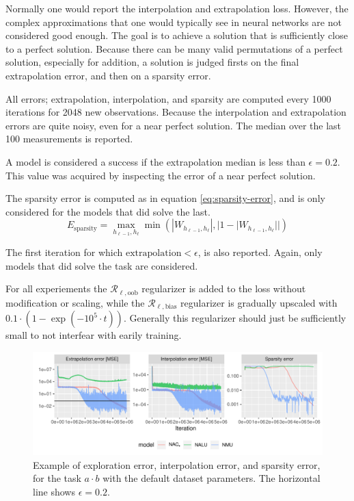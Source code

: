 Normally one would report the interpolation and extrapolation loss. However, the complex approximations that one would typically see in neural networks are not considered good enough. The goal is to achieve a solution that is sufficiently close to a perfect solution. Because there can be many valid permutations of a perfect solution, especially for addition, a solution is judged firsts on the final extrapolation error, and then on a sparsity error.

All errors; extrapolation, interpolation, and sparsity are computed every 1000 iterations for 2048 new observations. Because the interpolation and extrapolation errors are quite noisy, even for a near perfect solution. The median over the last 100 measurements is reported.

A model is considered a success if the extrapolation median is less than $\epsilon = 0.2$. This value was acquired by inspecting the error of a near perfect solution. 

The sparsity error is computed as in equation \ref{eq:sparsity-error}, and is only considered for the models that did solve the last.
\begin{equation}
E_\mathrm{sparsity} = \max_{h_{\ell-1}, h_{\ell}} \min(|W_{h_{\ell-1},h_\ell}|, |1 - |W_{h_{\ell-1},h_\ell}||)
\label{eq:sparsity-error}
\end{equation}

The first iteration for which $\mathrm{extrapolation} < \epsilon$, is also reported. Again, only models that did solve the task are considered.

For all experiements the $\mathcal{R}_{\ell,\mathrm{oob}}$ regularizer is added to the loss without modification or scaling, while the $\mathcal{R}_{\ell,\mathrm{bias}}$ regularizer is gradually upscaled with $0.1 \cdot (1 - \exp(-10^5 \cdot t))$. Generally this regularizer should just be sufficiently small to not interfear with earily training.

\begin{figure}[h]
\centering
\includegraphics[width=\linewidth]{results/function-task-static-example.pdf}
\caption{Example of exploration error, interpolation error, and sparsity error, for the task $a \cdot b$ with the default dataset parameters. The horizontal line shows $\epsilon = 0.2$.}
\end{figure}

